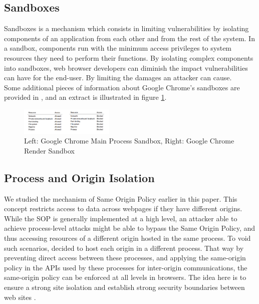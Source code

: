 \documentclass[journal]{IEEEtran}
\begin{document}
\subsection{Sandboxes}

Sandboxes is a mechanism which consists in limiting vulnerabilities by isolating components of an application from each other and from the rest of the system. In a sandbox, components run with the minimum access privileges to system resources they need to perform their functions.
By isolating complex components into sandboxes, web browser developers can diminish the impact vulnerabilities can have for the end-user. By limiting the damages an attacker can cause. \\

Some additional pieces of information about Google Chrome's sandboxes are provided in \cite{browserSecurityWhitePaper}, and an extract is illustrated in figure \ref{fig:ChromeSandboxes}.

\begin{figure}[h]
\centering
\includegraphics[width=0.4\textwidth]{images/SandboxesChrome.png}
\caption{Left: Google Chrome Main Process Sandbox, Right: Google Chrome Render Sandbox}
\label{fig:ChromeSandboxes}
\end{figure}

\subsection{Process and Origin Isolation}

We studied the mechanism of Same Origin Policy earlier in this paper. This concept restricts access to data across webpages if they have different origins. While the SOP is generally implemented at a high level, an attacker able to achieve process-level attacks might be able to bypass the Same Origin Policy, and thus accessing resources of a different origin hosted in the same process. To void such scenarios, decided to host each origin in a different process. That way by preventing direct access between these processes, and applying the same-origin policy in the APIs used by these processes for inter-origin communications, the same-origin policy can be enforced at all levels in browsers. The idea here is to ensure a strong site isolation and establish strong security boundaries between web sites \cite{isolationChrome}.
\end{document}
